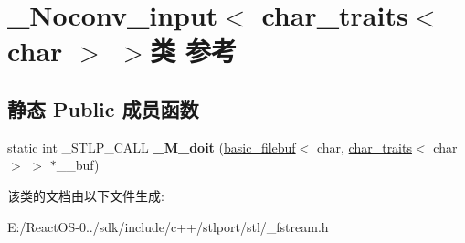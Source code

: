 \hypertarget{class___noconv__input_3_01char__traits_3_01char_01_4_01_4}{}\section{\+\_\+\+Noconv\+\_\+input$<$ char\+\_\+traits$<$ char $>$ $>$类 参考}
\label{class___noconv__input_3_01char__traits_3_01char_01_4_01_4}
\subsection*{静态 Public 成员函数}
\begin{DoxyCompactItemize}
\item 
\mbox{\label{class___noconv__input_3_01char__traits_3_01char_01_4_01_4_a7ff09b20bfe5832ba843d657c6dd20e7}} 
static int \+\_\+\+S\+T\+L\+P\+\_\+\+C\+A\+LL {\bfseries \+\_\+\+M\+\_\+doit} (\hyperlink{classbasic__filebuf}{basic\+\_\+filebuf}$<$ char, \hyperlink{classchar__traits}{char\+\_\+traits}$<$ char $>$ $>$ $\ast$\+\_\+\+\_\+buf)
\end{DoxyCompactItemize}


该类的文档由以下文件生成\+:\begin{DoxyCompactItemize}
\item 
E\+:/\+React\+O\+S-\/0../sdk/include/c++/stlport/stl/\+\_\+fstream.\+h\end{DoxyCompactItemize}
